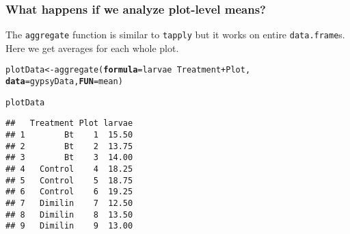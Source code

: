 \documentclass[color=usenames,dvipsnames]{beamer}\usepackage[]{graphicx}\usepackage[]{color}
\makeatletter
\newcommand{\hlopt}[1]{\textcolor[rgb]{0,0,0}{#1}}%
\newcommand{\hlstd}[1]{\textcolor[rgb]{0,0,0}{#1}}%
\newcommand{\hlkwb}[1]{\textcolor[rgb]{0,0.341,0.682}{#1}}%
\newcommand{\hlkwc}[1]{\textcolor[rgb]{0,0,0}{\textbf{#1}}}%
\newcommand{\hlkwd}[1]{\textcolor[rgb]{0.004,0.004,0.506}{#1}}%
\newenvironment{kframe}{%
 \def\at@end@of@kframe{}%
 \ifinner\ifhmode%
  \def\at@end@of@kframe{\end{minipage}}%
  \begin{minipage}{\columnwidth}%
 \fi\fi%
 \def\FrameCommand##1{\hskip\@totalleftmargin \hskip-\fboxsep
 \colorbox{shadecolor}{##1}\hskip-\fboxsep
     \hskip-\linewidth \hskip-\@totalleftmargin \hskip\columnwidth}%
 \MakeFramed {\advance\hsize-\width
   \@totalleftmargin\z@ \linewidth\hsize
   \@setminipage}}%
 {\par\unskip\endMakeFramed%
 \at@end@of@kframe}
\newenvironment{knitrout}{}{} %
\newcommand{\inr}[1]{\colorbox{inlinecolor}{\texttt{#1}}}
\makeatother
\begin{document}
\begin{frame}[fragile]
  \frametitle{What happens if we analyze plot-level means?}
  {%
    The \inr{aggregate} function is similar to \inr{tapply} but it
    works on entire {\tt data.frame}s. Here we get averages for each whole plot.}
  \footnotesize
\begin{knitrout}
\color{fgcolor}\begin{kframe}
\begin{alltt}
\hlstd{plotData} \hlkwb{<-} \hlkwd{aggregate}\hlstd{(}\hlkwc{formula}\hlstd{=larvae} \hlopt{~} \hlstd{Treatment} \hlopt{+} \hlstd{Plot,}
                      \hlkwc{data}\hlstd{=gypsyData,} \hlkwc{FUN}\hlstd{=mean)}
\end{alltt}
\end{kframe}
\end{knitrout}
\pause
\begin{knitrout}
\color{fgcolor}\begin{kframe}
\begin{alltt}
\hlstd{plotData}
\end{alltt}
\begin{verbatim}
##   Treatment Plot larvae
## 1        Bt    1  15.50
## 2        Bt    2  13.75
## 3        Bt    3  14.00
## 4   Control    4  18.25
## 5   Control    5  18.75
## 6   Control    6  19.25
## 7   Dimilin    7  12.50
## 8   Dimilin    8  13.50
## 9   Dimilin    9  13.00
\end{verbatim}
\end{kframe}
\end{knitrout}
\end{frame}
\end{document}
